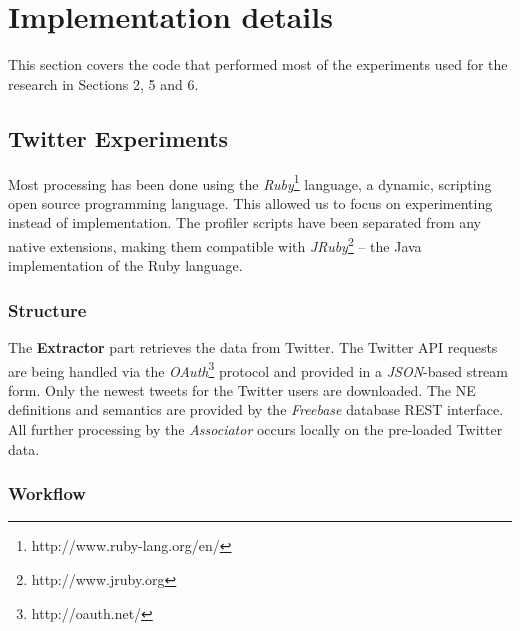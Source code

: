 \section{Implementation details}
\label{sec:implementation}

This section covers the code that performed most of the experiments used for the research in Sections 2, 5 and 6.

\subsection{Twitter Experiments}
Most processing has been done using the \textit{Ruby}\footnote{http://www.ruby-lang.org/en/}
language, a dynamic, scripting open source programming language. This allowed us
to focus on experimenting instead of implementation. The profiler scripts have been
separated from any native extensions, making them compatible with \textit{JRuby}\footnote{http://www.jruby.org}
-- the Java implementation of the Ruby language.

\subsubsection{Structure}
The \textbf{Extractor} part retrieves the data from Twitter. The Twitter API requests are being handled via the
\textit{OAuth}\footnote{http://oauth.net/} protocol and provided in a
\textit{JSON}-based stream form. Only the newest tweets for the Twitter
users are downloaded. The NE definitions and semantics are provided by
the \textit{Freebase} database REST interface. All further processing by the \textit{Associator}
occurs locally on the pre-loaded Twitter data.

\subsubsection{Workflow}


